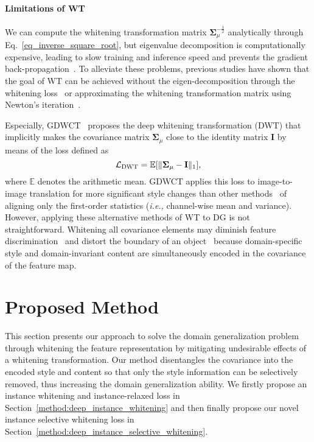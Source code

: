 \documentclass[final]{latex/cvpr}
\begin{document}
\vspace{-0.4cm}
\paragraph{Limitations of WT}
We can compute the whitening transformation matrix $\mathbf{\Sigma}_\mu^{-\frac{1}{2}}$ analytically through Eq.~\eqref{eq_inverse_square_root}, but eigenvalue decomposition is computationally expensive, leading to slow training and inference speed 
and prevents the gradient back-propagation~\cite{huang2018decorrelated, cho2019image}.
To alleviate these problems, previous studies have shown that the goal of WT can be achieved without the eigen-decomposition through the whitening loss~\cite{cho2019image} or approximating the whitening transformation matrix using Newton's iteration~\cite{huang2019iterative,huang2018decorrelated,pan2019switchable}.

Especially, GDWCT~\cite{cho2019image} proposes the deep whitening transformation (DWT) that implicitly makes the covariance matrix $\mathbf{\Sigma}_{\mu}$ close to the identity matrix $\mathbf{I}$ by means of the loss defined as
\vspace{-0.1cm}
\begin{equation} \label{eq_whitening_loss}
\mathcal{L}_{\text{DWT}} = \mathbb{E}[\Vert\mathbf{\Sigma_\mu} - \mathbf{I}\Vert_1],
\vspace{-0.1cm}
\end{equation}
where $\mathbb{E}$ denotes the arithmetic mean.
GDWCT applies this loss to image-to-image translation for more significant style changes than other methods~\cite{huang2018multimodal,lee2018diverse} of aligning only the first-order statistics (\textit{i.e.,} channel-wise mean and variance).
However, applying these alternative methods of WT to DG is not straightforward. Whitening all covariance elements may diminish feature discrimination~\cite{pan2019switchable,wadia2020whitening} and distort the boundary of an object~\cite{li2018closed,li2017universal} because domain-specific style and domain-invariant content are simultaneously encoded in the covariance of the feature map.



\vspace{-0.0cm}
\section{Proposed Method}\label{sec:proposed_method}
\vspace{-0.05cm}
This section presents our approach to solve the domain generalization problem through whitening the feature representation by mitigating undesirable effects of a whitening transformation.
Our method disentangles the covariance into the encoded style and content so that only the style information can be selectively removed, thus increasing the domain generalization ability. We firstly propose an instance whitening and instance-relaxed loss in Section~\ref{method:deep_instance_whitening} and then finally propose our novel instance selective whitening loss in Section~\ref{method:deep_instance_selective_whitening}.
\vspace{-0.05cm}
\end{document}
